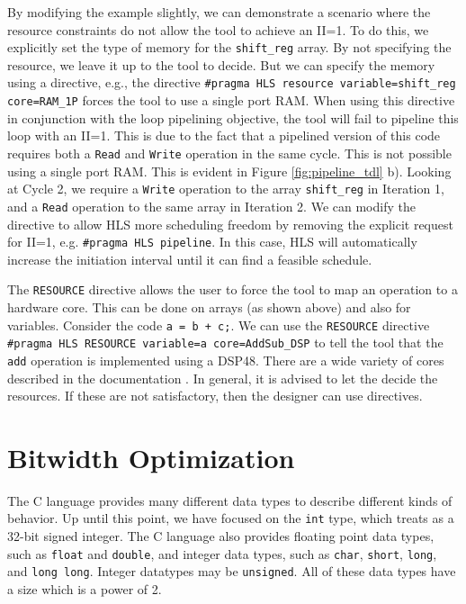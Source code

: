 By modifying the example slightly, we can demonstrate a scenario where the resource constraints do not allow the \VHLS tool to achieve an II=1. To do this, we explicitly set the type of memory for the \lstinline{shift_reg} array. By not specifying the resource, we leave it up to the \VHLS tool to decide. But we can specify the memory using a directive, e.g., the directive \lstinline{#pragma HLS resource variable=shift_reg core=RAM_1P} forces the \VHLS tool to use a single port RAM. When using this directive in conjunction with the loop pipelining objective, the \VHLS tool will fail to pipeline this loop with an II=1. This is due to the fact that a pipelined version of this code requires both a \lstinline{Read} and \lstinline{Write} operation in the same cycle. This is not possible using a single port RAM. This is evident in Figure \ref{fig:pipeline_tdl} b). Looking at Cycle 2, we require a \lstinline{Write} operation to the array \lstinline{shift_reg} in Iteration 1, and a \lstinline{Read} operation to the same array in Iteration 2.  We can modify the directive to allow HLS more scheduling freedom by removing the explicit request for II=1, e.g. \lstinline{#pragma HLS pipeline}.  In this case, HLS will automatically increase the initiation interval until it can find a feasible schedule.

\begin{aside}
The \lstinline{RESOURCE} directive allows the user to force the \VHLS tool to map an operation to a hardware core. This can be done on arrays (as shown above) and also for variables. Consider the code \lstinline{a = b + c;}. We can use the \lstinline{RESOURCE} directive \lstinline{#pragma HLS RESOURCE variable=a core=AddSub_DSP} to tell the \VHLS tool that the \lstinline{add} operation is implemented using a DSP48. There are a wide variety of cores described in the \VHLS documentation \cite{ug902}. In general, it is advised to let the \VHLS decide the resources. If these are not satisfactory, then the designer can use directives.
\end{aside}





\section{Bitwidth Optimization}

The C language provides many different data types to describe different kinds of behavior.  Up until this point, we have focused on the \lstinline{int} type, which \VHLS treats as a 32-bit signed integer.   The C language also provides floating point data types, such as \lstinline{float} and \lstinline{double}, and integer data types, such as \lstinline{char}, \lstinline{short}, \lstinline{long}, and \lstinline{long long}. Integer datatypes may be \lstinline{unsigned}. All of these data types have a size which is a power of 2.

